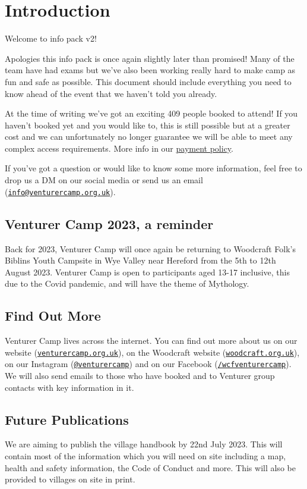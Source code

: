 \documentclass[a4paper, 11pt]{report}
\makeatletter
\newcommand{\nl}{\newline}
\newcommand{\infoemail}{\href{mailto:info@venturercamp.org.uk}{\texttt{info@venturercamp.org.uk}}}
\makeatother
\begin{document}
\tableofcontents
\chapter{Introduction}
Welcome to info pack v2!\nl

Apologies this info pack is once again slightly later than promised! Many of the team have had exams but we've also been working really hard to make camp as fun and safe as possible. This document should include everything you need to know ahead of the event that we haven't told you already.\nl 

At the time of writing we've got an exciting 409 people booked to attend! If you haven't booked yet and you would like to, this is still possible but at a greater cost and we can unfortunately no longer guarantee we will be able to meet any complex access requirements. More info in our \href{https://venturercamp.org.uk/wp-content/uploads/2023/05/payment-policy-v2.pdf}{payment policy}.\nl

If you've got a question or would like to know some more information, feel free to drop us a DM on our social media or send us an email (\infoemail).

\section{Venturer Camp 2023, a reminder}
Back for 2023, Venturer Camp will once again be returning to Woodcraft Folk's Biblins Youth Campsite in Wye Valley near Hereford from the 5th to 12th August 2023. Venturer Camp is open to participants aged 13-17 inclusive, this due to the Covid pandemic, and will have the theme of Mythology.

\section{Find Out More}
Venturer Camp lives across the internet. You can find out more about us on our website (\href{https://venturercamp.org.uk}{\texttt{venturercamp.org.uk}}), on the Woodcraft website (\href{https://woodcraft.org.uk}{\texttt{woodcraft.org.uk}}), on our Instagram (\href{https://www.instagram.com/venturercamp/}{\texttt{@venturercamp}}) and on our Facebook (\href{https://www.facebook.com/wcfventurercamp}{\texttt{/wcfventurercamp}}).
We will also send emails to those who have booked and to Venturer group contacts with key information in it.

\section{Future Publications}
We are aiming to publish the village handbook by 22nd July 2023. This will contain most of the information which you will need on site including a map, health and safety information, the Code of Conduct and more. This will also be provided to villages on site in print.
\end{document}
